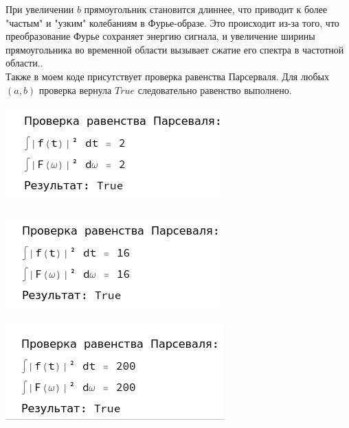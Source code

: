 \documentclass[a4paper,12pt]{article}
\begin{document}
При увеличении \( b \) прямоугольник становится длиннее, что приводит к более "частым" и "узким" колебаниям в Фурье-образе. Это происходит из-за того, что преобразование Фурье сохраняет энергию сигнала, и увеличение ширины прямоугольника во временной области вызывает сжатие его спектра в частотной области.. \\


Также в моем коде присутствует проверка равенства Парсерваля. Для любых \( (a, b) \) проверка вернула \( True\) следовательно равенство выполнено.


\begin{center}
\begin{minipage}{0.32\textwidth}
  \centering
  \includegraphics[width=\linewidth]{images/1P11.png}
\end{minipage}
\hfill
\begin{minipage}{0.32\textwidth}
  \centering
  \includegraphics[width=\linewidth]{images/1P22.png}
\end{minipage}
\hfill
\begin{minipage}{0.32\textwidth}
  \centering
  \includegraphics[width=\linewidth]{images/1P54.png}
\end{minipage}
\end{center}
\end{document}
